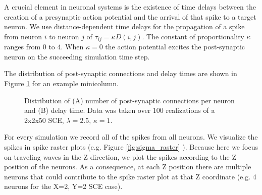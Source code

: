 A crucial element in neuronal systems is the existence of time delays between the creation of a presynaptic action potential and the arrival of that spike to a target neuron. 
We use distance-dependent time delays for the propagation of a spike from neuron $i$ to neuron $j$ of $\tau_{ij} = \kappa  D(i,j)$. 
The constant of proportionality $\kappa$ ranges from $0$ to $4$.
When $\kappa=0$ the action potential excites the post-synaptic neuron on the succeeding simulation time step.
 
The distribution of post-synaptic connections and delay times are shown in Figure \ref{fig:connection_delay_distrbution} for an example minicolumn.
\begin{figure}[!htb]
 \caption{Distribution of (A) number of post-synaptic connections per neuron and (B) delay time. Data was taken over 100 realizations of a 2x2x50 SCE, $\lambda=2.5$, $\kappa=1$.  } 
 \label{fig:connection_delay_distrbution}
\end{figure}
 \FloatBarrier
 
For every simulation we record all of the spikes from all neurons. 
We visualize the spikes in spike raster plots (e.g. Figure \ref{fig:sigma_raster} ).
Because here we focus on traveling waves in the Z direction, we plot the spikes according to the Z position of the neurons.
As a consequence, at each Z position there are multiple neurons that could contribute to the spike raster plot at that Z coordinate (e.g. 4 neurons for the X=2, Y=2 SCE case).

